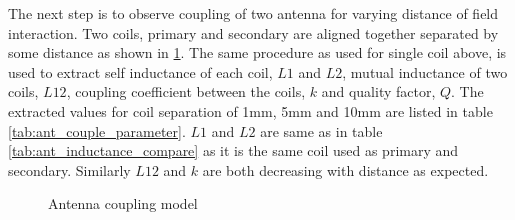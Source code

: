 \documentclass[12pt,a4paper,UKenglish]{article}
\begin{document}
The next step is to observe coupling of two antenna for varying distance of field interaction. Two coils, primary 
and secondary are aligned together separated by some distance as shown in \ref{fig:ant_couple}. The same procedure as 
used for single coil above, is used to extract self inductance of each coil, $L1$ and $L2$, mutual inductance 
of two coils, $L12$, coupling coefficient between the coils, $k$ and quality factor, $Q$. The extracted values for coil separation of 
1mm, 5mm and 10mm are listed in table \ref{tab:ant_couple_parameter}. $L1$ and $L2$ are same as in 
table \ref{tab:ant_inductance_compare} as it is the same coil used as primary and secondary. Similarly $L12$ and 
$k$ are both decreasing with distance as expected.\\

\begin{figure} [htbp]
  \centering 
\hfill
 \caption{Antenna coupling model} 
\label{fig:ant_couple} 
\end{figure}
\end{document}
